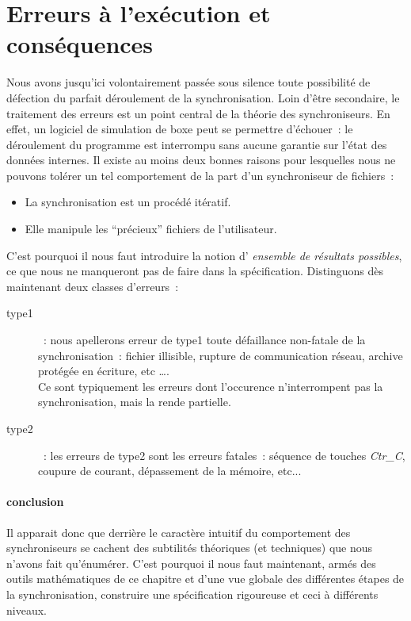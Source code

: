 \documentclass[11pt]{report}
\begin{document}
{\section{Erreurs \`a l'ex\'ecution et cons\'equences}
\label{sec:erreur}
Nous avons jusqu'ici volontairement pass\'ee sous silence toute possibilit\'e
de d\'efection du parfait d\'eroulement de la synchronisation. Loin d'\^etre
secondaire, le traitement des erreurs est un point central de la th\'eorie des
synchroniseurs. En effet, un logiciel de simulation de boxe peut 
se permettre d'\'echouer~: le d\'eroulement du programme est interrompu 
sans aucune garantie sur l'\'etat des donn\'ees internes. Il existe au moins 
deux bonnes raisons pour lesquelles nous ne pouvons tol\'erer un tel 
comportement de la part d'un synchroniseur de fichiers~: 
\begin{itemize}
\item La synchronisation est un proc\'ed\'e it\'eratif.
\item Elle manipule les ``pr\'ecieux'' fichiers de l'utilisateur.
\end{itemize}
C'est pourquoi il nous faut introduire la notion
d' \emph{ensemble de r\'esultats possibles}, ce que nous ne manqueront pas de
faire dans la sp\'ecification. Distinguons d\`es maintenant deux classes d'erreurs~:
\begin{description}
\item [type1]~: nous apellerons erreur de type1 toute d\'efaillance non-fatale
 de la synchronisation~: fichier illisible, rupture de communication r\'eseau,
archive prot\'eg\'ee en \'ecriture, etc \ldots.\\
Ce sont typiquement les erreurs dont l'occurence n'interrompent pas la 
synchronisation, mais la rende partielle.
\item [type2]~: les erreurs de type2 sont les erreurs fatales~: s\'equence
de touches \emph{Ctr\_C}, coupure de courant, d\'epassement de la m\'emoire, etc...
\end{description} 
\paragraph{conclusion\\}
Il apparait donc que derri\`ere le caract\`ere intuitif du comportement des
synchroniseurs se cachent des subtilit\'es th\'eoriques (et techniques) que
nous n'avons fait qu'\'enum\'erer. C'est pourquoi il nous faut maintenant,
arm\'es des outils math\'ematiques de ce chapitre et d'une vue globale des
diff\'erentes \'etapes de la synchronisation, construire une sp\'ecification
rigoureuse et ceci \`a diff\'erents niveaux.
}
\end{document}

